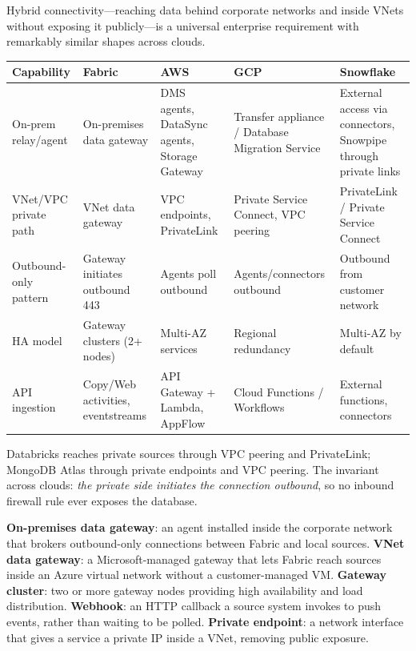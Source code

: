 \begin{crosscloud}
Hybrid connectivity---reaching data behind corporate networks and inside VNets without exposing it publicly---is a universal enterprise requirement with remarkably similar shapes across clouds.

\vspace{2mm}
{\footnotesize
\begin{tabular}{@{}p{2.8cm}p{3.2cm}p{3.2cm}p{3.2cm}p{3.2cm}@{}}
\toprule
\textbf{Capability} & \textbf{Fabric} & \textbf{AWS} & \textbf{GCP} & \textbf{Snowflake} \\
\midrule
On-prem relay/agent & On-premises data gateway & DMS agents, DataSync agents, Storage Gateway & Transfer appliance / Database Migration Service & External access via connectors, Snowpipe through private links \\
VNet/VPC private path & VNet data gateway & VPC endpoints, PrivateLink & Private Service Connect, VPC peering & PrivateLink / Private Service Connect \\
Outbound-only pattern & Gateway initiates outbound 443 & Agents poll outbound & Agents/connectors outbound & Outbound from customer network \\
HA model & Gateway clusters (2+ nodes) & Multi-AZ services & Regional redundancy & Multi-AZ by default \\
API ingestion & Copy/Web activities, eventstreams & API Gateway + Lambda, AppFlow & Cloud Functions / Workflows & External functions, connectors \\
\bottomrule
\end{tabular}}

\vspace{1mm}
Databricks reaches private sources through VPC peering and PrivateLink; MongoDB Atlas through private endpoints and VPC peering. The invariant across clouds: \emph{the private side initiates the connection outbound}, so no inbound firewall rule ever exposes the database.
\end{crosscloud}

\begin{keyterms}
\textbf{On-premises data gateway}: an agent installed inside the corporate network that brokers outbound-only connections between Fabric and local sources. \quad
\textbf{VNet data gateway}: a Microsoft-managed gateway that lets Fabric reach sources inside an Azure virtual network without a customer-managed VM. \quad
\textbf{Gateway cluster}: two or more gateway nodes providing high availability and load distribution. \quad
\textbf{Webhook}: an HTTP callback a source system invokes to push events, rather than waiting to be polled. \quad
\textbf{Private endpoint}: a network interface that gives a service a private IP inside a VNet, removing public exposure.
\end{keyterms}

